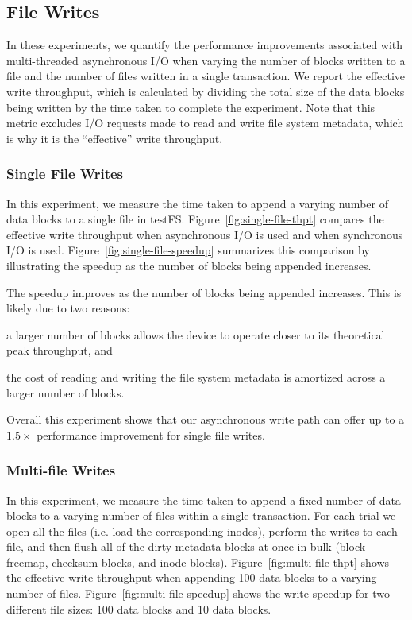\subsection{File Writes}
In these experiments, we quantify the performance improvements associated with
multi-threaded asynchronous I/O when varying the number of blocks written to a
file and the number of files written in a single transaction. We report the
effective write throughput, which is calculated by dividing the total size of
the data blocks being written by the time taken to complete the experiment.
Note that this metric excludes I/O requests made to read and write file system
metadata, which is why it is the ``effective'' write throughput.

\subsubsection{Single File Writes}
In this experiment, we measure the time taken to append a varying number of
data blocks to a single file in testFS. Figure~\ref{fig:single-file-thpt}
compares the effective write throughput when asynchronous I/O is used and when
synchronous I/O is used. Figure~\ref{fig:single-file-speedup} summarizes this
comparison by illustrating the speedup as the number of blocks being appended
increases.

The speedup improves as the number of blocks being appended increases. This is
likely due to two reasons:
\begin{enumerate*}[label={(\roman*)}]
  \item a larger number of blocks allows the device to operate closer to its
    theoretical peak throughput, and
  \item the cost of reading and writing the file system metadata is amortized
    across a larger number of blocks.
\end{enumerate*}
Overall this experiment shows that our asynchronous write path can offer up to
a $1.5\times$ performance improvement for single file writes.

\subsubsection{Multi-file Writes}
In this experiment, we measure the time taken to append a fixed number of data
blocks to a varying number of files within a single transaction. For each trial
we open all the files (i.e. load the corresponding inodes), perform the writes
to each file, and then flush all of the dirty metadata blocks at once in bulk
(block freemap, checksum blocks, and inode blocks).
Figure~\ref{fig:multi-file-thpt} shows the effective write throughput when
appending 100 data blocks to a varying number of files.
Figure~\ref{fig:multi-file-speedup} shows the write speedup for two different
file sizes: 100 data blocks and 10 data blocks.

